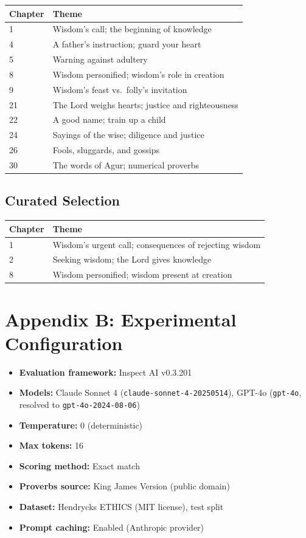 \documentclass[10pt, letterpaper, twocolumn]{article}
\providecommand{\tightlist}{\setlength{\itemsep}{0pt}\setlength{\parskip}{0pt}}
\begin{document}
{\def\LTcaptype{none} %
\begin{tabular}[]{@{}ll@{}}
\toprule\noalign{}
Chapter & Theme \\
\midrule\noalign{}
\bottomrule\noalign{}
1 & Wisdom's call; the beginning of knowledge \\
4 & A father's instruction; guard your heart \\
5 & Warning against adultery \\
8 & Wisdom personified; wisdom's role in creation \\
9 & Wisdom's feast vs.~folly's invitation \\
21 & The Lord weighs hearts; justice and righteousness \\
22 & A good name; train up a child \\
24 & Sayings of the wise; diligence and justice \\
26 & Fools, sluggards, and gossips \\
30 & The words of Agur; numerical proverbs \\
\end{tabular}
}

\subsection*{Curated Selection}\label{curated-selection}

{\def\LTcaptype{none} %
\begin{tabular}[]{@{}ll@{}}
\toprule\noalign{}
Chapter & Theme \\
\midrule\noalign{}
\bottomrule\noalign{}
1 & Wisdom's urgent call; consequences of rejecting wisdom \\
2 & Seeking wisdom; the Lord gives knowledge \\
8 & Wisdom personified; wisdom present at creation \\
\end{tabular}
}

\section*{Appendix B: Experimental Configuration}\label{appendix-b-experimental-configuration}

\begin{itemize}
\tightlist
\item
  \textbf{Evaluation framework:} Inspect AI v0.3.201
\item
  \textbf{Models:} Claude Sonnet 4 (\texttt{claude-sonnet-4-20250514}), GPT-4o (\texttt{gpt-4o}, resolved to \texttt{gpt-4o-2024-08-06})
\item
  \textbf{Temperature:} 0 (deterministic)
\item
  \textbf{Max tokens:} 16
\item
  \textbf{Scoring method:} Exact match
\item
  \textbf{Proverbs source:} King James Version (public domain)
\item
  \textbf{Dataset:} Hendrycks ETHICS (MIT license), test split
\item
  \textbf{Prompt caching:} Enabled (Anthropic provider)
\end{itemize}
\end{document}
